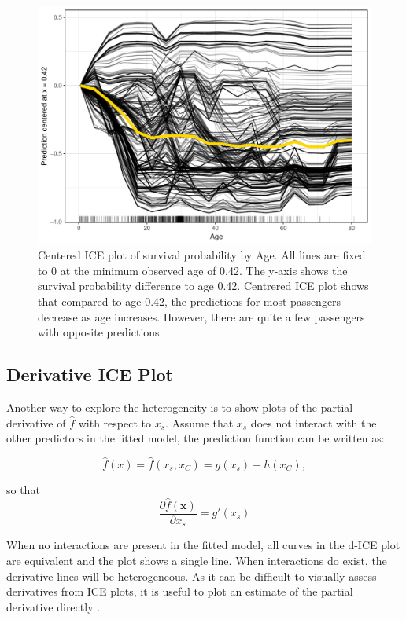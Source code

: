 \documentclass[]{krantz}
\begin{document}
\begin{figure}

{\centering \includegraphics[width=0.8\linewidth]{images/PDP_Plot_6} 

}

\caption{Centered ICE plot of survival probability by Age. All lines are fixed to 0 at the minimum observed age of 0.42. The y-axis shows the survival probability difference to age 0.42. Centrered ICE plot shows that compared to age 0.42, the predictions for most passengers decrease as age increases. However, there are quite a few passengers with opposite predictions.}\label{fig:plot6}
\end{figure}

\subsection{Derivative ICE Plot}\label{derivative-ice-plot}

Another way to explore the heterogeneity is to show plots of the partial
derivative of \(\hat{f}\) with respect to \(x_s\). Assume that \(x_s\)
does not interact with the other predictors in the fitted model, the
prediction function can be written as:

\[\hat{f}(x) = \hat{f}(x_s,x_C) = g(x_s) + h(x_C),\]

so that \[\frac{\partial{\hat{f}(\mathbf{x})}}{\partial x_s} = g'(x_s)\]

When no interactions are present in the fitted model, all curves in the
d-ICE plot are equivalent and the plot shows a single line. When
interactions do exist, the derivative lines will be heterogeneous. As it
can be difficult to visually assess derivatives from ICE plots, it is
useful to plot an estimate of the partial derivative directly
\citep{Goldstein2013}.
\end{document}
